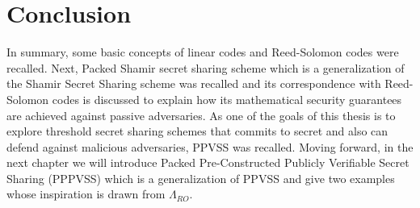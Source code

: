 \section{Conclusion}
In summary, some basic concepts of linear codes and Reed-Solomon codes were recalled. Next, Packed Shamir secret sharing scheme which is a generalization of the Shamir Secret Sharing scheme \cite{10.1145/359168.359176} 
was recalled and its correspondence with Reed-Solomon codes is discussed to explain how 
its mathematical security guarantees are achieved against passive adversaries. As one 
of the goals of this thesis is to explore threshold secret sharing schemes that commits to 
secret and also 
can defend against malicious adversaries, PPVSS \cite{cryptoeprint:2025/576} was recalled. 
Moving forward, in the next chapter we will introduce 
Packed Pre-Constructed Publicly Verifiable Secret Sharing (PPPVSS) which is a generalization of 
PPVSS and give two examples whose inspiration is drawn from $\Lambda_{RO}$.

